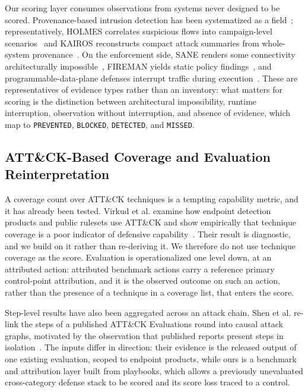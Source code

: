 Our scoring layer consumes observations from systems never designed to be scored. Provenance-based intrusion detection has been systematized as a field~\cite{inam2023sokprovenance}; representatively, HOLMES correlates suspicious flows into campaign-level scenarios~\cite{milajerdi2019holmes} and KAIROS reconstructs compact attack summaries from whole-system provenance~\cite{cheng2024kairos}. On the enforcement side, SANE renders some connectivity architecturally impossible~\cite{casado2006sane}, FIREMAN yields static policy findings~\cite{yuan2006fireman}, and programmable-data-plane defenses interrupt traffic during execution~\cite{zhang2020poseidon,yoo2024smartcookie}. These are representatives of evidence types rather than an inventory: what matters for scoring is the distinction between architectural impossibility, runtime interruption, observation without interruption, and absence of evidence, which map to \texttt{PREVENTED}, \texttt{BLOCKED}, \texttt{DETECTED}, and \texttt{MISSED}.

\subsection{ATT\&CK-Based Coverage and Evaluation Reinterpretation}
\label{subsec:rw-attck-coverage}

A coverage count over ATT\&CK techniques is a tempting capability metric, and it has already been tested. Virkud et al. examine how endpoint detection products and public rulesets use ATT\&CK and show empirically that technique coverage is a poor indicator of defensive capability~\cite{virkud2024endpoint}. Their result is diagnostic, and we build on it rather than re-deriving it. We therefore do not use technique coverage as the score. Evaluation is operationalized one level down, at an attributed action: attributed benchmark actions carry a reference primary control-point attribution, and it is the observed outcome on such an action, rather than the presence of a technique in a coverage list, that enters the score.

Step-level results have also been aggregated across an attack chain. Shen et al. re-link the steps of a published ATT\&CK Evaluations round into causal attack graphs, motivated by the observation that published reports present steps in isolation~\cite{shen2024decoding}. The inputs differ in direction: their evidence is the released output of one existing evaluation, scoped to endpoint products, while ours is a benchmark and attribution layer built from playbooks, which allows a previously unevaluated cross-category defense stack to be scored and its score loss traced to a control.

